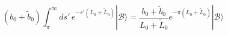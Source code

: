 \begin{equation} %
  (b_0 +\tilde{b}_0)
\int_{ \pi}^{\infty} ds' \, e^{-s' (L_0+\tilde{L}_0)}|\mathcal{B}\rangle
 = \frac{b_0 +\tilde{b}_0}{L_0+\tilde{L}_0} e^{-\pi (L_0+\tilde{L}_0)}
|\mathcal{B}\rangle
\end{equation} 
